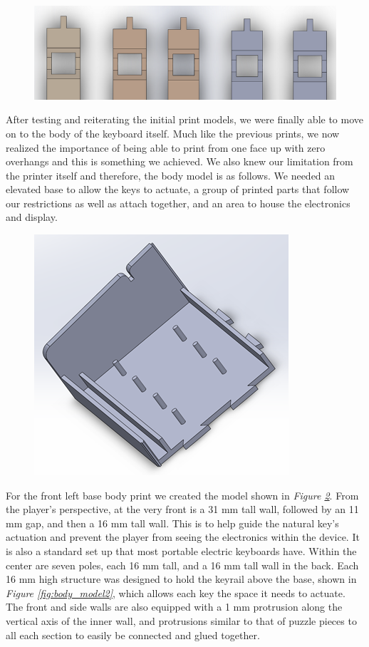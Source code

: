 \begin{figure}[h!]
  \centering
  \includegraphics[width=0.8\linewidth]{image/KeyModels.png}
  \caption{}
  \label{fig:key_models}
\end{figure}

After testing and reiterating the initial print models, we were finally able to move on to the body of the keyboard itself. Much like the previous prints, we now realized the importance of being able to print from one face up with zero overhangs and this is something we achieved. We also knew our limitation from the printer itself and therefore, the body model is as follows. We needed an elevated base to allow the keys to actuate, a group of printed parts that follow our restrictions as well as attach together, and an area to house the electronics and display.

\begin{figure}[h!]
  \centering
  \includegraphics[width=0.8\linewidth]{image/BodyModel1.png}
  \caption{}
  \label{fig:body_model1}
\end{figure}

For the front left base body print we created the model shown in \textit{Figure \ref{fig:body_model1}}. From the player’s perspective, at the very front is a 31 mm tall wall, followed by an 11 mm gap, and then a 16 mm tall wall. This is to help guide the natural key’s actuation and prevent the player from seeing the electronics within the device. It is also a standard set up that most portable electric keyboards have. Within the center are seven poles, each 16 mm tall, and a 16 mm tall wall in the back. Each 16 mm high structure was designed to hold the keyrail above the base, shown in \textit{Figure \ref{fig:body_model2}}, which allows each key the space it needs to actuate. The front and side walls are also equipped with a 1 mm protrusion along the vertical axis of the inner wall, and protrusions similar to that of puzzle pieces to all each section to easily be connected and glued together.

